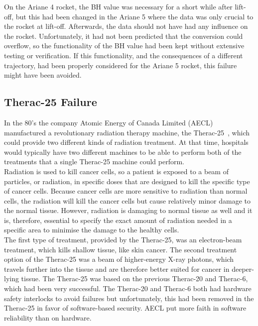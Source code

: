 On the Ariane 4 rocket, the BH value was necessary for a short while after lift-off, but this had been changed in the Ariane 5 where the data was only crucial to the rocket at lift-off. Afterwards, the data should not have had any influence on the rocket. Unfortunately, it had not been predicted that the conversion could overflow, so the functionality of the BH value had been kept without extensive testing or verification. If this functionality, and the consequences of a different trajectory, had been properly considered for the Ariane 5 rocket, this failure might have been avoided.
\subsection{Therac-25 Failure}
In the 80's the company Atomic Energy of Canada Limited (AECL) manufactured a revolutionary radiation therapy machine, the Therac-25~\cite{Leveson1993}, which could provide two different kinds of radiation treatment. At that time, hospitals would typically have two different machines to be able to perform both of the treatments that a single Therac-25 machine could perform.\\

Radiation is used to kill cancer cells, so a patient is exposed to a beam of particles, or radiation, in specific doses that are designed to kill the specific type of cancer cells. Because cancer cells are more sensitive to radiation than normal cells, the radiation will kill the cancer cells but cause relatively minor damage to the normal tissue. However, radiation is damaging to normal tissue as well and it is, therefore, essential to specify the exact amount of radiation needed in a specific area to minimise the damage to the healthy cells.\\

The first type of treatment, provided by the Therac-25, was an electron-beam treatment, which kills shallow tissue, like skin cancer. The second treatment option of the Therac-25 was a beam of higher-energy X-ray photons, which travels further into the tissue and are therefore better suited for cancer in deeper-lying tissue.
The Therac-25 was based on the previous Therac-20 and Therac-6, which had been very successful. The Therac-20 and Therac-6 both had hardware safety interlocks to avoid failures but unfortunately, this had been removed in the Therac-25 in favor of software-based security. AECL put more faith in software reliability than on hardware. \\

